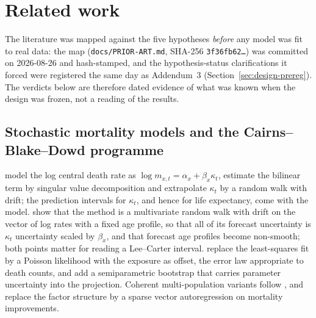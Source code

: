 \section{Related work}
\label{sec:related}

The literature was mapped against the five hypotheses \emph{before} any
model was fit to real data: the map (\texttt{docs/PRIOR-ART.md}, SHA-256
\texttt{3f36fb62\ldots}) was committed on 2026-08-26 and hash-stamped, and
the hypothesis-status clarifications it forced were registered the same day
as Addendum~3 (Section~\ref{sec:design-prereg}). The verdicts below are
therefore dated evidence of what was known when the design was frozen, not
a reading of the results.

\subsection{Stochastic mortality models and the Cairns--Blake--Dowd programme}

\citet{lee1992modeling} model the log central death rate as
$\log m_{x,t} = \alpha_x + \beta_x \kappa_t$, estimate the bilinear term by
singular value decomposition and extrapolate $\kappa_t$ by a random walk with
drift; the prediction intervals for $\kappa_t$, and hence for life
expectancy, come with the model. \citet{girosi2007understanding} show that
the method is a multivariate random walk with drift on the vector of log
rates with a fixed age profile, so that all of its forecast uncertainty is
$\kappa_t$ uncertainty scaled by $\beta_x$, and that forecast age profiles
become non-smooth; both points matter for reading a Lee--Carter interval.
\citet{brouhns2002poisson} replace the least-squares fit by a Poisson
likelihood with the exposure as offset, the error law appropriate to death
counts, and \citet{brouhns2005bootstrapping} add a semiparametric bootstrap
that carries parameter uncertainty into the projection. Coherent
multi-population variants follow \citet{li2005coherent}, and
\citet{li2017coherent} replace the factor structure by a sparse vector
autoregression on mortality improvements.

